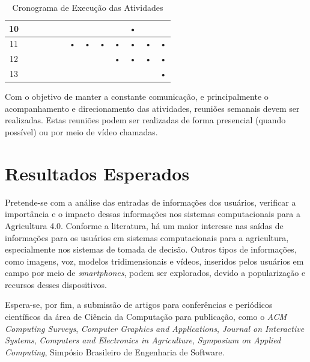 \documentclass[12pt]{article}
\begin{document}
\begin{table}[htbp]
\begin{tabular}{|c|c|c|c|c|c|c|c|c|c|c|c|c|}
	10                  &            &            &           &            &            &           &            &            &           & •          &            &           \\ \hline
	11                  &            &            &           &            &            & •         & •          & •          & •         & •          & •          & •         \\ \hline
	12                  &            &            &           &            &            &           &            &            & •         & •          & •          & •         \\ \hline
	13                  &            &            &           &            &            &           &            &            &           &            &            & •         \\ \hline
	\end{tabular}
	\caption{Cronograma de Execução das Atividades}
	\label{tab:cronograma}
\end{table}

Com o objetivo de manter a constante comunicação, e principalmente o acompanhamento e direcionamento das atividades, reuniões semanais devem ser realizadas. Estas reuniões podem ser realizadas de forma presencial (quando possível) ou por meio de vídeo chamadas.

\section{Resultados Esperados}
\label{sec:resultados_esperados}

Pretende-se com a análise das entradas de informações dos usuários, verificar a importância e o impacto dessas informações nos sistemas computacionais para a Agricultura 4.0. Conforme a literatura, há um maior interesse nas saídas de informações para os usuários em sistemas computacionais para a agricultura, especialmente nos sistemas de tomada de decisão. Outros tipos de informações, como imagens, voz, modelos tridimensionais e vídeos, inseridos pelos usuários em campo por meio de \textit{smartphones}, podem ser explorados, devido a popularização e recursos desses dispositivos.

Espera-se, por fim, a submissão de artigos para conferências e periódicos científicos da área de Ciência da Computação para publicação, como o \textit{ACM Computing Surveys}, \textit{Computer Graphics and Applications}, \textit{Journal on Interactive Systems}, \textit{Computers and Electronics in Agriculture}, \textit{Symposium on Applied Computing}, Simpósio Brasileiro de Engenharia de Software. 



\end{document}

